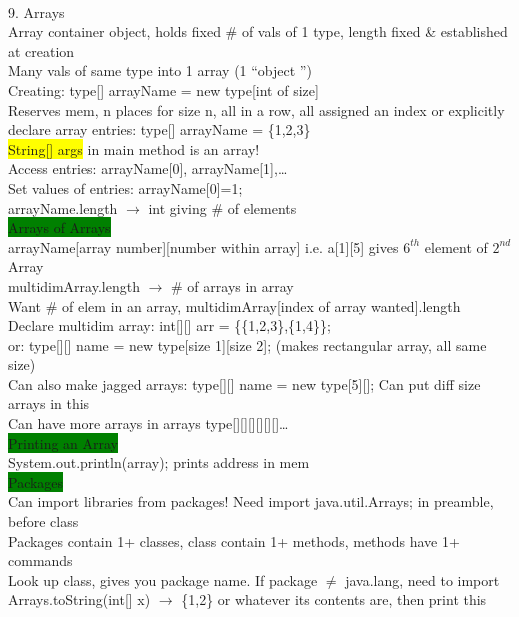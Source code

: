 ~\\ \color{YellowGreen}
9. Arrays
\\ Array container object, holds fixed \# of vals of 1 type, length fixed \& established at creation
\\ Many vals of same type into 1 array (1 \textquotedblleft object \textquotedblright)
\\ Creating: type[] arrayName = new type[int of size]
\\ Reserves mem, n places for size n, all in a row, all assigned an index or explicitly declare array entries: type[] arrayName = \{1,2,3\}
\\ \colorbox{Yellow}{String[] args} in main method is an array!
\\ Access entries: arrayName[0], arrayName[1],\ldots
\\ Set values of entries: arrayName[0]=1;
\\ arrayName.length $\rightarrow$ int giving \# of elements
\\ \colorbox{Green}{Arrays of Arrays}
\\ arrayName[array number][number within array] i.e. a[1][5] gives $6^{th}$ element of $2^{nd}$ Array
\\ multidimArray.length $\rightarrow$ \# of arrays in array
\\ Want \# of elem in an array, multidimArray[index of array wanted].length
\\ Declare multidim array: int[][] arr = \{\{1,2,3\},\{1,4\}\};
\\ or: type[][] name = new type[size 1][size 2]; (makes rectangular array, all same size)
\\ Can also make jagged arrays: type[][] name = new type[5][]; Can put diff size arrays in this
\\ Can have more arrays in arrays type[][][][][][]\ldots
\\ \colorbox{Green}{Printing an Array}
\\ System.out.println(array); prints address in mem
\\ \colorbox{Green}{Packages}
\\ Can import libraries from packages! Need import java.util.Arrays; in preamble, before class
\\ Packages contain 1+ classes, class contain 1+ methods, methods have 1+ commands
\\ Look up class, gives you package name. If package $\neq$ java.lang, need to import
\\ Arrays.toString(int[] x) $\rightarrow$ \{1,2\} or whatever its contents are, then print this
